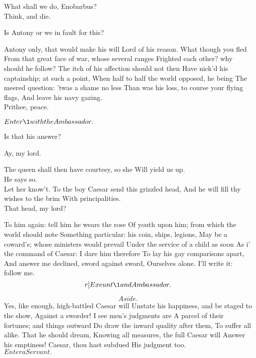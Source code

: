 \documentclass{book}
\begin{document}
\2	What shall we do, Enobarbus?  \\

	Think, and die.

\2	Is Antony or we in fault for this?

	Antony only, that would make his will
	Lord of his reason. What though you fled
	From that great face of war, whose several ranges
	Frighted each other? why should he follow?
	The itch of his affection should not then
	Have nick'd his captainship; at such a point,
	When half to half the world opposed, he being
	The meered question: 'twas a shame no less
	Than was his loss, to course your flying flags,
	And leave his navy gazing. \\

\2	Prithee, peace.

	\(Enter \1 with the Ambassador.\)

\1	Is that his answer?

	Ay, my lord.

\1	The queen shall then have courtesy, so she
	Will yield us up. \\

	                  He says so. \\

\1	Let her know't.
	To the boy Caesar send this grizzled head,
	And he will fill thy wishes to the brim
	With principalities. \\

\2	That head, my lord?

\1	To him again: tell him he wears the rose
	Of youth upon him; from which the world should note
	Something particular: his coin, ships, legions,
	May be a coward's; whose ministers would prevail
	Under the service of a child as soon
	As i' the command of Caesar: I dare him therefore
	To lay his gay comparisons apart,
	And answer me declined, sword against sword,
	Ourselves alone. I'll write it: follow me. \[r]Exeunt \1 and Ambassador.\]

	\[Aside.\]  Yes, like enough, high-battled Caesar will
	Unstate his happiness, and be staged to the show,
	Against a sworder! I see men's judgments are
	A parcel of their fortunes; and things outward
	Do draw the inward quality after them,
	To suffer all alike. That he should dream,
	Knowing all measures, the full Caesar will
	Answer his emptiness! Caesar, thou hast subdued
	His judgment too. \\

	\(Enter a Servant.\)
\end{document}
